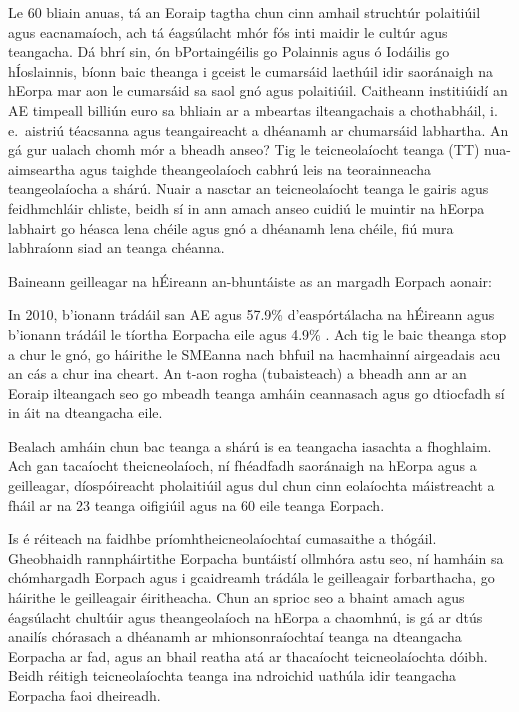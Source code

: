 \begin{multicols}{2}
Le 60 bliain anuas, tá an Eoraip tagtha chun cinn amhail struchtúr polaitiúil agus eacnamaíoch, ach tá éagsúlacht mhór fós inti maidir le cultúr agus teangacha. Dá bhrí sin, ón bPortaingéilis go Polainnis agus ó Iodáilis go hÍoslainnis, bíonn baic theanga i gceist le cumarsáid laethúil idir saoránaigh na hEorpa mar aon le cumarsáid sa saol gnó agus polaitiúil. Caitheann institiúidí an AE timpeall billiún euro sa bhliain ar a mbeartas ilteangachais a chothabháil, i.\,e.~aistriú téacsanna agus teangaireacht a dhéanamh ar chumarsáid labhartha. An gá gur ualach chomh mór a bheadh anseo? Tig le teicneolaíocht teanga (TT) nua-aimseartha agus taighde theangeolaíoch cabhrú leis na teorainneacha teangeolaíocha a shárú. Nuair a nasctar an teicneolaíocht teanga le gairis agus feidhmchláir chliste, beidh sí in ann amach anseo cuidiú le muintir na hEorpa labhairt go héasca lena chéile agus gnó a dhéanamh lena chéile, fiú mura labhraíonn siad an teanga chéanna.  


Baineann geilleagar na hÉireann an-bhuntáiste as an margadh Eorpach aonair: 

In 2010, b’ionann trádáil san AE agus 57.9\% d’easpórtálacha na hÉireann agus b’ionann trádáil le tíortha Eorpacha eile agus 4.9\% \cite{csoirishtrade}.  Ach tig le baic theanga stop a chur le gnó, go háirithe le SMEanna nach bhfuil na hacmhainní airgeadais acu an cás a chur ina cheart.  An t-aon rogha (tubaisteach) a bheadh ann ar an Eoraip ilteangach seo go mbeadh teanga amháin ceannasach agus go dtiocfadh sí in áit na dteangacha eile.

Bealach amháin chun bac teanga a shárú is ea teangacha iasachta a fhoghlaim. Ach gan tacaíocht theicneolaíoch, ní fhéadfadh saoránaigh na hEorpa agus a geilleagar, díospóireacht pholaitiúil agus dul chun cinn eolaíochta máistreacht a fháil ar na 23 teanga oifigiúil agus na 60 eile teanga Eorpach. 

Is é réiteach na faidhbe príomhtheicneolaíochtaí cumasaithe a thógáil. Gheobhaidh rannpháirtithe Eorpacha buntáistí ollmhóra astu seo, ní hamháin sa chómhargadh Eorpach agus i gcaidreamh trádála le geilleagair forbarthacha, go háirithe le geilleagair éiritheacha.  Chun an sprioc seo a bhaint amach agus éagsúlacht chultúir agus theangeolaíoch na hEorpa a chaomhnú, is gá ar dtús anailís chórasach a dhéanamh ar mhionsonraíochtaí teanga na dteangacha Eorpacha ar fad, agus an bhail reatha atá ar thacaíocht teicneolaíochta dóibh. Beidh réitigh teicneolaíochta teanga ina ndroichid uathúla idir teangacha Eorpacha faoi dheireadh.  


\end{multicols}
